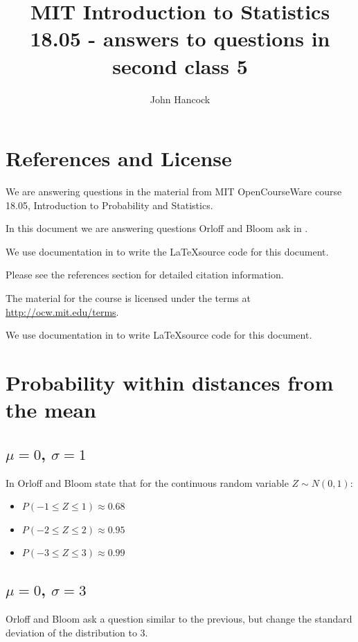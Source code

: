\documentclass[a4paper,11pt]{article}
\author{John Hancock}
\title{MIT Introduction to Statistics 18.05 - answers to questions in second class 5 }
\begin{document}
\maketitle
\tableofcontents
\section{References and License}
We are answering questions in the material from MIT OpenCourseWare
course 18.05, Introduction to Probability and Statistics.

In this document we are answering questions Orloff and Bloom ask in
\cite{slides5b}.

We use documentation in \cite{includeGr} to write the \LaTeX source code for
this document.

Please see the references section for detailed citation information.

The material for the course is licensed under the terms at
\url{http://ocw.mit.edu/terms}.

We use documentation in
to write \LaTeX source code for this document.

\section{Probability within distances from the mean}

\subsection{ $\mu = 0$, $\sigma=1$}
In \cite{reading5c} Orloff and Bloom state that for the continuous random
variable $Z \sim N \left(0, 1 \right)$:
\begin{itemize}
	\item $P\left( -1 \leq Z \leq 1 \right) \approx 0.68$
	\item $P\left( -2 \leq Z \leq 2 \right) \approx 0.95$
	\item $P\left( -3 \leq Z \leq 3 \right) \approx 0.99$
\end{itemize}

\subsection{ $\mu=0$, $\sigma=3$}

Orloff and Bloom ask a question similar to the previous, but change the
standard deviation of the distribution to 3.
\end{document}

